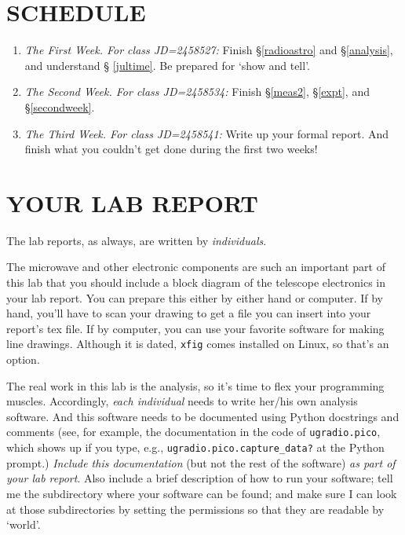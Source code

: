 \documentclass[12pt,preprint]{aastex}
\begin{document}
\section{SCHEDULE}
\begin{enumerate}
\item {\it The First Week. For class JD=2458527:} %
Finish \S\ref{radioastro} and \S \ref{analysis}, and understand \S
  \ref{jultime}. Be prepared for `show and tell'.

\item {\it The Second Week. For class JD=2458534:} %
Finish \S \ref{meas2}, \S \ref{expt}, and \S \ref{secondweek}. 

\item {\it The Third Week. For class JD=2458541:} Write up your formal
  report. And finish what you couldn't get done during the first two
  weeks!
\end{enumerate}

\section{YOUR LAB REPORT}

The lab reports, as always, are written by {\it individuals}. 

The microwave and other electronic components are such an important part of this
lab that you should include a block diagram of the telescope electronics
in your lab report. You can prepare this either by either hand or
computer. If by hand, you'll have to scan your drawing to get a file you can
insert into your report's tex file. If by computer, you can use your
favorite software for making line drawings.  Although it is dated, {\tt xfig}
comes installed on Linux, so that's an option.

The real work in this lab is the analysis, so it's time to 
flex your programming muscles. Accordingly, {\it
  each individual} needs to write her/his own analysis software. And this
software needs to be documented using Python docstrings and comments
(see, for example, the documentation in the code of {\tt ugradio.pico}, which
shows up if you type, e.g., {\tt ugradio.pico.capture\_data?} at the Python prompt.)
{\it Include this
  documentation} (but not the rest of the software) {\it as part of your lab
report}. Also include a brief description of how to run your software;
tell me the subdirectory where your software can be found; and make sure
I can look at those subdirectories by setting the permissions so that
they are readable by `world'. 
\end{document}
